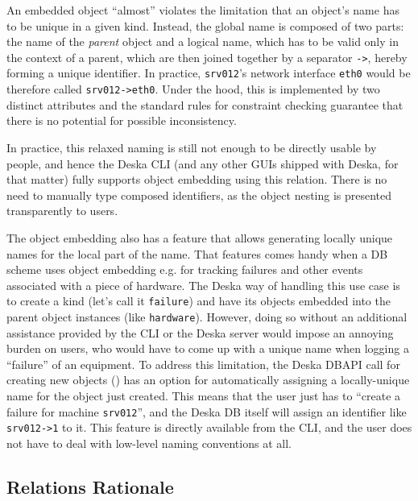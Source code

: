 \documentclass[deska]{subfiles}
\begin{document}
An embedded object ``almost'' violates the limitation that an object's name has to be unique in a given kind.  Instead,
the global name is composed of two parts: the name of the {\em parent} object and a logical name, which has to be valid
only in the context of a parent, which are then joined together by a separator {\tt ->}, hereby forming a unique
identifier.  In practice, {\tt srv012}'s network interface {\tt eth0} would be therefore called {\tt srv012->eth0}.
Under the hood, this is implemented by two distinct attributes and the standard rules for constraint checking guarantee
that there is no potential for possible inconsistency.

In practice, this relaxed naming is still not enough to be directly usable by people, and hence the Deska CLI (and any
other GUIs shipped with Deska, for that matter) fully supports object embedding using this relation.  There is no need
to manually type composed identifiers, as the object nesting is presented transparently to users.

The object embedding also has a feature that allows generating locally unique names for the local part of the name.
That features comes handy when a DB scheme uses object embedding e.g. for tracking failures and other events associated
with a piece of hardware.  The Deska way of handling this use case is to create a kind (let's call it {\tt failure}) and
have its objects embedded into the parent object instances (like {\tt hardware}).  However, doing so without an
additional assistance provided by the CLI or the Deska server would impose an annoying burden on users, who would have
to come up with a unique name when logging a ``failure'' of an equipment.  To address this limitation, the Deska DBAPI
call for creating new objects () has an option for automatically assigning a locally-unique
name for the object just created.  This means that the user just has to ``create a failure for machine {\tt srv012}'',
and the Deska DB itself will assign an identifier like {\tt srv012->1} to it.  This feature is directly available from
the CLI, and the user does not have to deal with low-level naming conventions at all.

\subsection{Relations Rationale}
\end{document}
